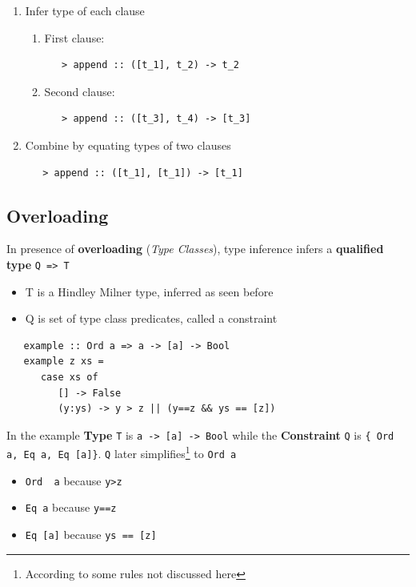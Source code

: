 \begin{enumerate}
   \item Infer type of each clause
   \begin{enumerate}
      \item First clause:
      \begin{lstlisting}
   > append :: ([t_1], t_2) -> t_2
      \end{lstlisting}
      \item Second clause:
      \begin{lstlisting}
   > append :: ([t_3], t_4) -> [t_3]
      \end{lstlisting}
   \end{enumerate}
   \item Combine by equating types of two clauses
   \begin{lstlisting}
   > append :: ([t_1], [t_1]) -> [t_1]
   \end{lstlisting}
\end{enumerate}

\subsection{Overloading}
In presence of \textbf{overloading} (\textit{Type Classes}), type inference infers a \textbf{qualified type} \lstinline|Q => T|
\begin{itemize}
   \item T is a Hindley Milner type, inferred as seen before
   \item Q is set of type class predicates, called a constraint
\end{itemize}
\begin{lstlisting}
   example :: Ord a => a -> [a] -> Bool
   example z xs = 
      case xs of
         [] -> False
         (y:ys) -> y > z || (y==z && ys == [z])
\end{lstlisting}

\begin{paracol}{2}
   \colfill
   In the example \textbf{Type} \lstinline|T| is \lstinline|a -> [a] -> Bool|
   while the \textbf{Constraint} \lstinline|Q| is \lstinline|{ Ord a, Eq a, Eq [a]}|.
   \lstinline|Q| later simplifies\footnote{According to some rules not discussed here} to \lstinline|Ord a|
   \colfill
   \switchcolumn

   \begin{itemize}
      \item \lstinline|Ord  a| because \lstinline|y>z|
      \item \lstinline|Eq a| because \lstinline|y==z|
      \item \lstinline|Eq [a]| because \lstinline|ys == [z]|
   \end{itemize}
\end{paracol}

